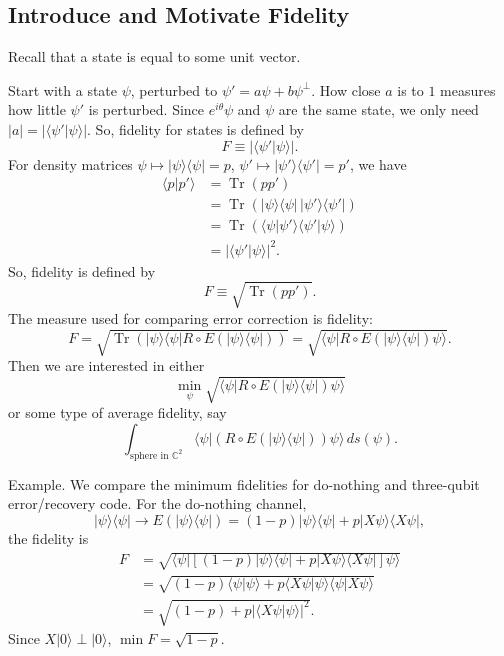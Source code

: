 \documentclass[12pt]{article}
\theoremstyle{definition}
\newcommand{\C}{\mathbb{C}}
\begin{document}
\subsection{Introduce and Motivate Fidelity}

Recall that a state is equal to some unit vector.

Start with a state $\psi$, perturbed to $\psi'=a\psi+b\psi^\perp$. How close $a$ is to $1$ measures how little $\psi'$ is perturbed. Since $e^{i\theta}\psi$ and $\psi$ are the same state, we only need $|a|=|\langle \psi'|\psi\rangle|$. So, fidelity for states is defined by
\[
F \equiv |\langle \psi'|\psi\rangle|.
\]
For density matrices $\psi \mapsto |\psi\rangle\langle \psi|=p$, $\psi' \mapsto |\psi'\rangle\langle \psi'|=p'$, we have
\begin{align*}
\langle p|p'\rangle &= \operatorname{Tr}(pp') \\
&= \operatorname{Tr}(|\psi\rangle\langle \psi|\,|\psi'\rangle\langle \psi'|) \\
&= \operatorname{Tr}(\langle \psi|\psi'\rangle\langle \psi'|\psi\rangle) \\
&= |\langle \psi'|\psi\rangle|^2.
\end{align*}
So, fidelity is defined by
\[
F \equiv \sqrt{\operatorname{Tr}(pp')}.
\]
The measure used for comparing error correction is fidelity:
\[
F = \sqrt{\operatorname{Tr}(|\psi\rangle\langle \psi|R \circ E(|\psi\rangle\langle \psi|))} = \sqrt{\langle \psi|R \circ E(|\psi\rangle\langle \psi|)\psi\rangle}.
\]
Then we are interested in either
\[
\min_{\psi} \sqrt{\langle \psi|R \circ E(|\psi\rangle\langle \psi|)\psi\rangle}
\]
or some type of average fidelity, say
\[
\int_{\text{sphere in }\C^2} \langle \psi|(R \circ E(|\psi\rangle\langle \psi|))\psi\rangle \, ds(\psi).
\]

Example. We compare the minimum fidelities for do-nothing and three-qubit error/recovery code. For the do-nothing channel,
\[
|\psi\rangle\langle \psi| \to E(|\psi\rangle\langle \psi|)=(1-p)|\psi\rangle\langle \psi| + p|X\psi\rangle\langle X\psi|,
\]
the fidelity is
\begin{align*}
F &= \sqrt{\langle \psi|[(1-p)|\psi\rangle\langle \psi|+p|X\psi\rangle\langle X\psi|]\psi\rangle} \\
&= \sqrt{(1-p)\langle \psi|\psi\rangle + p\langle X\psi|\psi\rangle\langle \psi|X\psi\rangle} \\
&= \sqrt{(1-p)+p|\langle X\psi|\psi\rangle|^2}.
\end{align*}
Since $X|0\rangle \perp |0\rangle$, $\min F = \sqrt{1-p}$.
\end{document}
